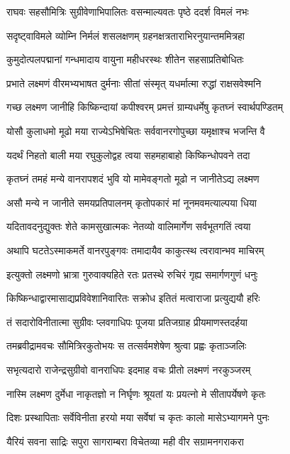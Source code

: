 \twolineshloka
{राघवः सहसौमित्रिः सुग्रीवेणाभिपालितः}
{वसन्माल्यवतः पृष्ठे ददर्श विमलं नभः}


\twolineshloka
{सदृष्ट्वाविमले व्योम्नि निर्मलं शसलक्षणम्}
{ग्रहनक्षत्रताराभिरनुयान्तममित्रहा}


\twolineshloka
{कुमुदोत्पलपद्मानां गन्धमादाय वायुना}
{महीधरस्थः शीतेन सहसाप्रतिबोधितः}


\twolineshloka
{प्रभाते लक्ष्मणं वीरमभ्यभाषत दुर्मनाः}
{सीतां संस्मृत् यधर्मात्मा रुद्धां राक्षसवेश्मनि}


\twolineshloka
{गच्छ लक्ष्मण जानीहि किष्किन्दायां कपीश्वरम्}
{प्रमत्तं ग्राम्यधर्मेषु कृतघ्नं स्वार्थपण्डितम्}


\twolineshloka
{योसौ कुलाधमो मूढो मया राज्येऽभिषेचितः}
{सर्ववानरगोपुच्छा यमृक्षाश्च भजन्ति वै}


\twolineshloka
{यदर्थं निहतो बाली मया रघुकुलोद्वह}
{त्वया सहमहाबाहो किष्किन्धोपवने तदा}


\twolineshloka
{कृतघ्नं तमहं मन्ये वानरापशदं भुवि}
{यो मामेवङ्गतो मूढो न जानीतेऽद्य लक्ष्मण}


\twolineshloka
{असौ मन्ये न जानीते समयप्रतिपालनम्}
{कृतोपकारं मां नूनमवमत्याल्पया धिया}


\twolineshloka
{यदितावदनुद्युक्तः शेते कामसुखात्मकः}
{नेतव्यो वालिमार्गेण सर्वभूतगतिं त्वया}


\twolineshloka
{अथापि घटतेऽस्माकमर्ते वानरपुङ्गवः}
{तमादायैव काकुत्स्थ त्वरावान्भव माचिरम्}


\twolineshloka
{इत्युक्तो लक्ष्मणो भ्रात्रा गुरुवाक्यहिते रतः}
{प्रतस्थे रुचिरं गृह्य समार्गणगुणं धनुः}


\twolineshloka
{किष्किन्धाद्वारमासाद्यप्रविवेशानिवारितः}
{सक्रोध इतितं मत्वाराजा प्रत्युद्ययौ हरिः}


\twolineshloka
{तं सदारोविनीतात्मा सुग्रीवः प्लवगाधिपः}
{पूजया प्रतिजग्राह प्रीयमाणस्तदर्हया}


\twolineshloka
{तमब्रवीद्रामवचः सौमित्रिरकुतोभयः}
{स तत्सर्वमशेषेण श्रुत्वा प्रह्वः कृताञ्जलिः}


\twolineshloka
{सभृत्यदारो राजेन्द्रसुग्रीवो वानराधिपः}
{इदमाह वचः प्रीतो लक्ष्मणं नरकुञ्जरम्}


\twolineshloka
{नास्मि लक्ष्मण दुर्मेधा नाकृतज्ञो न निर्घृणः}
{श्रूयतां यः प्रयत्नो मे सीतापर्येषणे कृतः}


\twolineshloka
{दिशः प्रस्थापिताः सर्वेविनीता हरयो मया}
{सर्वेषां च कृतः कालो मासेऽभ्यागमने पुनः}


\twolineshloka
{यैरियं सवना साद्रिः सपुरा सागराम्बरा}
{विचेतव्या मही वीर सग्रामनगराकरा}


